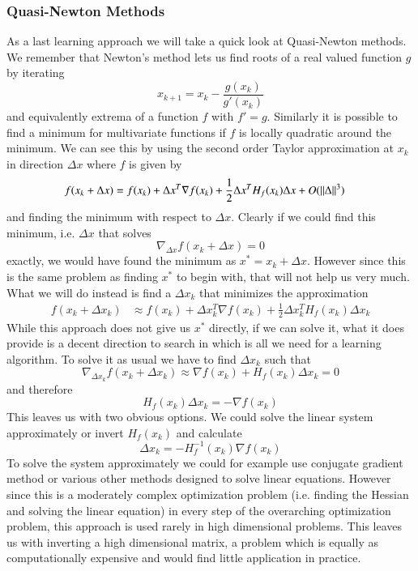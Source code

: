\documentclass[preprint,12pt,3p]{elsarticle}
\begin{document}
\subsubsection{Quasi-Newton Methods}
As a last learning approach we will take a quick look at Quasi-Newton methods. We remember that Newton's method lets us find roots of a real valued function $g$ by iterating
$$x_{k+1}=x_k-\frac{g(x_k)}{g'(x_k)}$$
and equivalently extrema of a function $f$ with $f'=g$. Similarly it is possible to find a minimum for multivariate functions if $f$ is locally quadratic around the minimum. We can see this by using the second order Taylor approximation at $x_k$ in direction $\Delta x$ where $f$ is given by
\begin{align*}
    f(x_k+\Delta x)&=f(x_k)+\Delta x^T \nabla f(x_k)+ \frac{1}{2}\Delta x^TH_f(x_k)\Delta x+O(\Arrowvert\Delta\Arrowvert^3)
\end{align*}
and finding the minimum with respect to $\Delta x$. Clearly if we could find this minimum, i.e. $\Delta x$ that solves $$\nabla_{\Delta x}f(x_k+\Delta x)=0$$ exactly, we would have found the minimum as $x^*=x_k+\Delta x$. However since this is the same problem as finding $x^*$ to begin with, that will not help us very much. What we will do instead is find a $\Delta x_k$ that minimizes the approximation 
\begin{align*}
    f(x_k+\Delta x_k)&\approx f(x_k)+\Delta x_k^T \nabla f(x_k)+ \frac{1}{2}\Delta x_k^TH_f(x_k)\Delta x_k
\end{align*}
While this approach does not give us $x^*$ directly, if we can solve it, what it does provide is a decent direction to search in which is all we need for a learning algorithm. To solve it as usual we have to find $\Delta x_k$ such that  
$$\nabla_{\Delta x_k}f(x_k+\Delta x_k)\approx\nabla f(x_k)+H_f(x_k)\Delta x_k=0$$
and therefore
$$H_f(x_k)\Delta x_k= -\nabla f(x_k)$$
This leaves us with two obvious options. We could solve the linear system approximately or invert $H_f(x_k)$ and calculate
$$\Delta x_k= -H^{-1}_f(x_k)\nabla f(x_k)$$
To solve the system approximately we could for example use conjugate gradient method or various other methods designed to solve linear equations. However since this is a moderately complex optimization problem (i.e. finding the Hessian and solving the linear equation) in every step of the overarching optimization problem, this approach is used rarely in high dimensional problems. This leaves us with inverting a high dimensional matrix, a problem which is equally as computationally expensive and would find little application in practice. 
\end{document}
